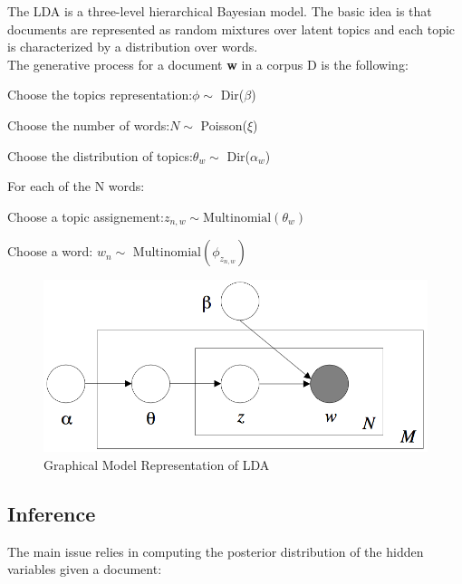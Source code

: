 \documentclass[twoside]{article}
\begin{document}
\begin{multicols}{2}
The LDA is a three-level hierarchical Bayesian model. The basic idea is that documents are represented as random mixtures over latent topics and each topic is characterized by a distribution over words.\cite{LDA}\\


\noindent The generative process for a document \textbf{w} in a corpus D is the following:
\\
\begin{compactenum}
	\item Choose the topics representation:\newline $\phi \sim$ Dir($\beta$)
	\item Choose the number of words:\newline $ N \sim $ Poisson($ \xi $)
	\item Choose the distribution of topics:\newline $\theta_w \sim$ Dir($\alpha_w$)
	\item For each of the N words:
	\begin{compactenum}
		\item Choose a topic assignement:\newline $z_{n,w} \sim \text{Multinomial}(\theta_w)$
		\item Choose a word: \newline$w_n \sim \text{ Multinomial}(\phi_{z_{n,w}})$
	\end{compactenum}
\end{compactenum}

\begin{figure}[H]
\centering
\includegraphics[width=0.8\linewidth]{img/LDA.png}
\caption{Graphical Model Representation of LDA}
\end{figure}

\subsection{Inference}

The main issue relies in computing the posterior distribution of the hidden variables given a document:\\


\end{multicols}
\end{document}
